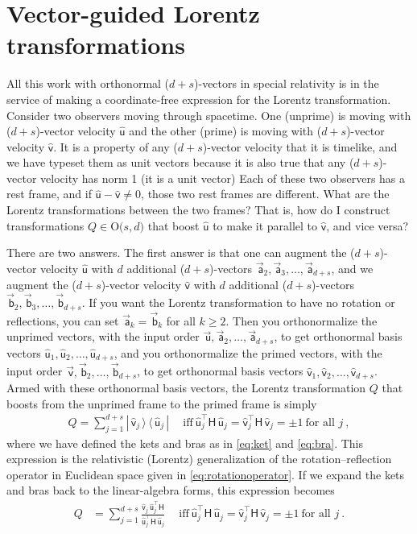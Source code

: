 \documentclass{article}
\newcommand{\metric}{\mathsf{H}}
\newcommand\upvec[1]{\!\vec{\,\mathrm{#1}}}
\newcommand{\Lvec}[1]{\upvec{\mathsf{#1}}} %
\newcommand{\Lhat}[1]{\hat{\mathsf{#1}}} %
\newcommand{\ketbra}[2]{|\,{#1}\,\rangle\,\langle\,{#2}\,|}
\newcommand{\plus}{\!+\!} %
\begin{document}
\section{Vector-guided Lorentz transformations}\label{sec:lt}

All this work with orthonormal ($d\plus s$)-vectors in special relativity is in the service of making a coordinate-free expression for the Lorentz transformation.
Consider two observers moving through spacetime.
One (unprime) is moving with ($d\plus s$)-vector velocity $\Lhat{u}$ and the other (prime) is moving with ($d\plus s$)-vector velocity $\Lhat{v}$.
It is a property of any ($d\plus s$)-vector velocity that it is timelike, and we have typeset them as unit vectors because it is also true that any ($d\plus s$)-vector velocity has norm 1 (it is a unit vector)
Each of these two observers has a rest frame, and if $\Lhat{u}-\Lhat{v}\neq 0$, those two rest frames are different.
What are the Lorentz transformations between the two frames?
That is, how do I construct transformations $Q\in\mbox{O($s,d$)}$ that boost $\Lhat{u}$ to make it parallel to $\Lhat{v}$, and vice versa?

There are two answers.
The first answer is that one can augment the ($d\plus s$)-vector velocity $\Lhat{u}$ with $d$ additional ($d\plus s$)-vectors $\Lvec{a}_2,\Lvec{a}_3,\ldots,\Lvec{a}_{d+s}$, and we augment the ($d\plus s$)-vector velocity $\Lhat{v}$ with $d$ additional ($d\plus s$)-vectors $\Lvec{b}_2,\Lvec{b}_3,\ldots,\Lvec{b}_{d+s}$.
If you want the Lorentz transformation to have no rotation or reflections, you can set $\Lvec{a}_k=\Lvec{b}_k$ for all $k\geq 2$.
Then you orthonormalize the unprimed vectors, with the input order $\Lvec{u},\Lvec{a}_2,\ldots,\Lvec{a}_{d+s}$, to get orthonormal basis vectors $\Lhat{u}_1,\Lhat{u}_2,\ldots,\Lhat{u}_{d+s}$, and you orthonormalize the primed vectors, with the input order $\Lvec{v},\Lvec{b}_2,\ldots,\Lvec{b}_{d+s}$, to get orthonormal basis vectors $\Lhat{v}_1,\Lhat{v}_2,\ldots,\Lhat{v}_{d+s}$.
Armed with these orthonormal basis vectors, the Lorentz transformation $Q$ that boosts from the unprimed frame to the primed frame is simply
\begin{align}
  Q = \sum_{j=1}^{d+s} \ketbra{\Lhat{v}_j}{\Lhat{u}_j} \quad~ \mbox{iff} ~ \Lhat{u}_j^\top\metric\,\Lhat{u}_j = \Lhat{v}_j^\top\metric\,\Lhat{v}_j = \pm 1 ~ \mbox{for all $j$} \label{eq:LTQM} ~,
\end{align}
where we have defined the kets and bras as in \eqref{eq:ket} and \eqref{eq:bra}.
This expression is the relativistic (Lorentz) generalization of the rotation--reflection operator in Euclidean space given in \eqref{eq:rotationoperator}.
If we expand the kets and bras back to the linear-algebra forms, this expression becomes
\begin{align}
  Q &= \sum_{j=1}^{d+s} \frac{\Lhat{v}_j\,\Lhat{u}_j^\top\metric}{\Lhat{u}_j^\top\metric\,\Lhat{u}_j} \quad~ \mbox{iff} ~ \Lhat{u}_j^\top\metric\,\Lhat{u}_j = \Lhat{v}_j^\top\metric\,\Lhat{v}_j = \pm 1 ~ \mbox{for all $j$} ~.
\end{align}
\end{document}

